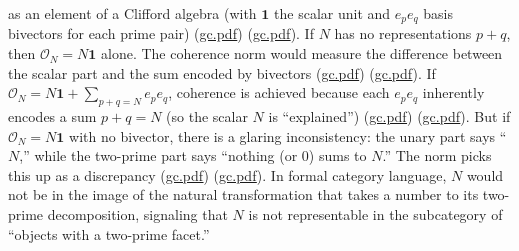 \documentclass[12pt]{article}
\begin{document}
as an element of a Clifford algebra (with $\mathbf{1}$ the scalar unit and $e_p e_q$ basis bivectors for each prime pair) (\href{file://file-7ZYYwSHWVa83XEVTrEhg5z#:~:text=the%20Clifford%20algebra%20can%20represent,to%20encode%20these%20different%20grades}{gc.pdf}) (\href{file://file-7ZYYwSHWVa83XEVTrEhg5z#:~:text=ON%3A%3DN%E2%8B%851%2B%E2%88%91p%2Bq%3DNepeq%5Cmathcal,via%20the%20Spin%20group%20of}{gc.pdf}). If $N$ has no representations $p+q$, then $\mathcal{O}_N = N\mathbf{1}$ alone. The coherence norm would measure the difference between the scalar part and the sum encoded by bivectors (\href{file://file-7ZYYwSHWVa83XEVTrEhg5z#:~:text=if%20they%20coincide%29,N}{gc.pdf}) (\href{file://file-7ZYYwSHWVa83XEVTrEhg5z#:~:text=equals%20the%20sum%20given%20by,1%7D%24%20with%20no%20bivectors}{gc.pdf}). If $\mathcal{O}_N = N\mathbf{1} + \sum_{p+q=N} e_pe_q$, coherence is achieved because each $e_pe_q$ inherently encodes a sum $p+q=N$ (so the scalar $N$ is “explained”) (\href{file://file-7ZYYwSHWVa83XEVTrEhg5z#:~:text=part%20equals%20the%20sum%20given,sense%20that%20there%20is%20a}{gc.pdf}) (\href{file://file-7ZYYwSHWVa83XEVTrEhg5z#:~:text=%5Csum,theory%2C%20one%20might%20include%20a}{gc.pdf}). But if $\mathcal{O}_N = N\mathbf{1}$ with no bivector, there is a glaring inconsistency: the unary part says ``$N$,'' while the two-prime part says ``nothing (or 0) sums to $N$.'' The norm picks this up as a discrepancy (\href{file://file-7ZYYwSHWVa83XEVTrEhg5z#:~:text=%24e_pe_q%24%20inherently%20encodes%20a%20sum,channel%20and%20measure%20the%20discrepancy}{gc.pdf}) (\href{file://file-7ZYYwSHWVa83XEVTrEhg5z#:~:text=%24%5Cmathcal,realize%20it%2C%20the%20discrepancy%20is}{gc.pdf}). In formal category language, $N$ would not be in the image of the natural transformation that takes a number to its two-prime decomposition, signaling that $N$ is not representable in the subcategory of ``objects with a two-prime facet.'' 
\end{document}

